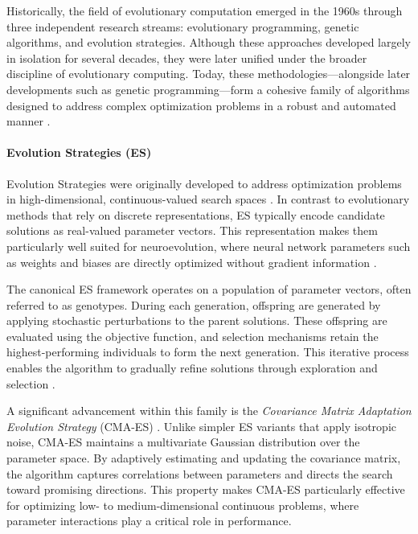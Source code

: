 Historically, the field of evolutionary computation emerged in the 1960s through three independent research streams: evolutionary programming, genetic algorithms, and evolution strategies. Although these approaches developed largely in isolation for several decades, they were later unified under the broader discipline of evolutionary computing. Today, these methodologies—alongside later developments such as genetic programming—form a cohesive family of algorithms designed to address complex optimization problems in a robust and automated manner \citep{eiben2015ec}.

\paragraph{Evolution Strategies (ES)}

Evolution Strategies were originally developed to address optimization problems in high-dimensional, continuous-valued search spaces \citep{rechenberg1973evolutionsstrategie,schwefel1977numerical}. In contrast to evolutionary methods that rely on discrete representations, ES typically encode candidate solutions as real-valued parameter vectors. This representation makes them particularly well suited for neuroevolution, where neural network parameters such as weights and biases are directly optimized without gradient information \citep{risi2017neuroevolution}.

The canonical ES framework operates on a population of parameter vectors, often referred to as genotypes. During each generation, offspring are generated by applying stochastic perturbations to the parent solutions. These offspring are evaluated using the objective function, and selection mechanisms retain the highest-performing individuals to form the next generation. This iterative process enables the algorithm to gradually refine solutions through exploration and selection \citep{pagliuca2018}.

A significant advancement within this family is the \textit{Covariance Matrix Adaptation Evolution Strategy} (CMA-ES) \citep{hansen2001cmaes}. Unlike simpler ES variants that apply isotropic noise, CMA-ES maintains a multivariate Gaussian distribution over the parameter space. By adaptively estimating and updating the covariance matrix, the algorithm captures correlations between parameters and directs the search toward promising directions. This property makes CMA-ES particularly effective for optimizing low- to medium-dimensional continuous problems, where parameter interactions play a critical role in performance.

